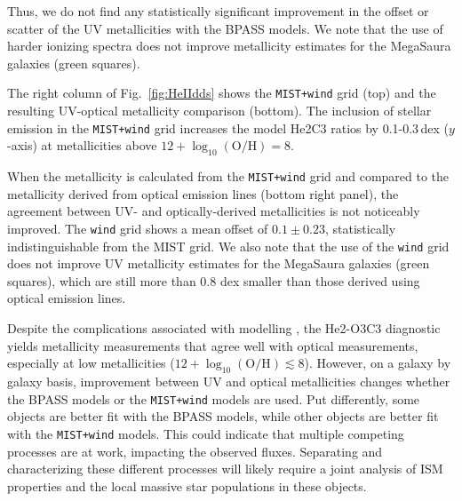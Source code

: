 \documentclass[preprint2]{aastex62}
\newcommand{\heii}{\ion{He}{2}}
\newcommand{\logten}{\ensuremath{\log_{10}}}
\newcommand{\logOH}{\ensuremath{\logten (\mathrm{O}/\mathrm{H})}\xspace}
\newcommand{\mage}{{\sc Meg}a{\sc S}a{\sc ura}\xspace}
\begin{document}
Thus, we do not find any statistically significant improvement in the offset or scatter of the UV metallicities with the BPASS models. We note that the use of harder ionizing spectra does not improve metallicity estimates for the \mage galaxies (green squares).

The right column of Fig.~\ref{fig:HeIIdds} shows the {\tt MIST+wind} grid (top) and the resulting UV-optical metallicity comparison (bottom). The inclusion of stellar \heii{} emission in the {\tt MIST+wind} grid increases the model He2C3 ratios by 0.1-0.3\,dex ($y$-axis) at metallicities above $12+\logOH=8$.

When the metallicity is calculated from the {\tt MIST+wind} grid and compared to the metallicity derived from optical emission lines (bottom right panel), the agreement between UV- and optically-derived metallicities is not noticeably improved. The {\tt wind} grid shows a mean offset of $0.1\pm 0.23$, statistically indistinguishable from the MIST grid. We also note that the use of the {\tt wind} grid does not improve UV metallicity estimates for the \mage galaxies (green squares), which are still more than 0.8 dex smaller than those derived using optical emission lines. 

Despite the complications associated with modelling \heii{}, the He2-O3C3 diagnostic yields metallicity measurements that agree well with optical measurements, especially at low metallicities ($12+\logOH \lesssim 8$). However, on a galaxy by galaxy basis, improvement between UV and optical metallicities changes whether the BPASS models or the {\tt MIST+wind} models are used. Put differently, some objects are better fit with the BPASS models, while other objects are better fit with the {\tt MIST+wind} models. This could indicate that multiple competing processes are at work, impacting the observed \heii{} fluxes. Separating and characterizing these different processes will likely require a joint analysis of ISM properties and the local massive star populations in these objects.
\end{document}
